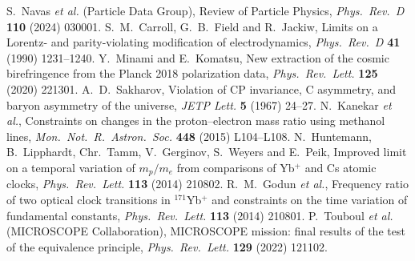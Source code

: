  S.~Navas \emph{et al.} (Particle Data Group), Review of Particle Physics, \emph{Phys.\ Rev.\ D} \textbf{110} (2024) 030001.
 S.~M.~Carroll, G.~B.~Field and R.~Jackiw, Limits on a Lorentz- and parity-violating modification of electrodynamics, \emph{Phys.\ Rev.\ D} \textbf{41} (1990) 1231--1240.
 Y.~Minami and E.~Komatsu, New extraction of the cosmic birefringence from the Planck 2018 polarization data, \emph{Phys.\ Rev.\ Lett.} \textbf{125} (2020) 221301.
 A.~D.~Sakharov, Violation of CP invariance, C asymmetry, and baryon asymmetry of the universe, \emph{JETP Lett.} \textbf{5} (1967) 24--27.
 N.~Kanekar \emph{et al.}, Constraints on changes in the proton--electron mass ratio using methanol lines, \emph{Mon.\ Not.\ R.\ Astron.\ Soc.} \textbf{448} (2015) L104--L108.
 N.~Huntemann, B.~Lipphardt, Chr.~Tamm, V.~Gerginov, S.~Weyers and E.~Peik, Improved limit on a temporal variation of $m_p/m_e$ from comparisons of Yb$^+$ and Cs atomic clocks, \emph{Phys.\ Rev.\ Lett.} \textbf{113} (2014) 210802.
 R.~M.~Godun \emph{et al.}, Frequency ratio of two optical clock transitions in $^{171}$Yb$^+$ and constraints on the time variation of fundamental constants, \emph{Phys.\ Rev.\ Lett.} \textbf{113} (2014) 210801.
 P.~Touboul \emph{et al.} (MICROSCOPE Collaboration), MICROSCOPE mission: final results of the test of the equivalence principle, \emph{Phys.\ Rev.\ Lett.} \textbf{129} (2022) 121102.
